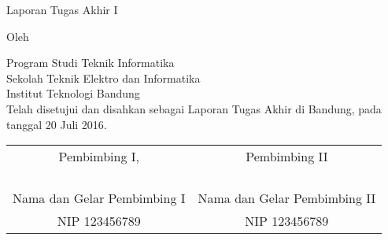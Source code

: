\clearpage
\pagestyle{empty}

\begin{center}
    \smallskip

    \Large \bfseries \MakeUppercase{\thetitle}
    \vfill

    \Large Laporan Tugas Akhir I
    \vfill

    \large Oleh

    \Large \theauthor

    \large Program Studi Teknik Informatika \\
    Sekolah Teknik Elektro dan Informatika \\
    Institut Teknologi Bandung \\

    \vfill
    \normalsize \normalfont
    Telah disetujui dan disahkan sebagai Laporan Tugas Akhir di Bandung, pada tanggal 20 Juli 2016.

    \vfill
    \setlength{\tabcolsep}{12pt}
    \begin{tabular}{c@{\hskip 0.5in}c}
        Pembimbing I,               & Pembimbing II                \\
                                    &                              \\
                                    &                              \\
                                    &                              \\
                                    &                              \\
        Nama dan Gelar Pembimbing I & Nama dan Gelar Pembimbing II \\
        NIP 123456789               & NIP 123456789                \\
    \end{tabular}

\end{center}
\clearpage
